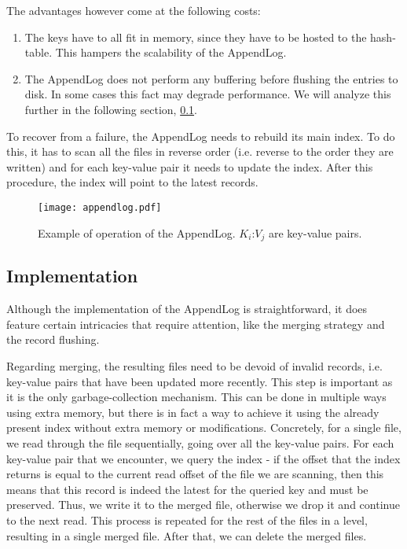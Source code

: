 The advantages however come at the following costs:
\begin{enumerate}
    \item The keys have to all fit in memory, since they have to be hosted to the hash-table. This hampers the scalability of the AppendLog.
    \item The AppendLog does not perform any buffering before flushing the entries to disk. In some cases this fact may degrade performance. We will analyze this further in the following section, \ref{appendlog-implementation}.
\end{enumerate}

To recover from a failure, the AppendLog needs to rebuild its main index. To do this, it has to scan all the files in reverse order (i.e. reverse to the order they are written) and for each key-value pair it needs to update the index. After this procedure, the index will point to the latest records.

\vspace{20px}
\begin{figure}[h]
    \centering
    \texttt{[image: appendlog.pdf]}
    \caption{Example of operation of the AppendLog. $K_i$:$V_j$ are key-value pairs.}
    \label{fig:appendlog}
\end{figure}
\vspace{20px}

\subsection{Implementation}
\label{appendlog-implementation}

Although the implementation of the AppendLog is straightforward, it does feature certain intricacies that require attention, like the merging strategy and the record flushing.

Regarding merging, the resulting files need to be devoid of invalid records, i.e. key-value pairs that have been updated more recently. This step is important as it is the only garbage-collection mechanism. This can be done in multiple ways using extra memory, but there is in fact a way to achieve it using the already present index without extra memory or modifications. Concretely, for a single file, we read through the file sequentially, going over all the key-value pairs. For each key-value pair that we encounter, we query the index - if the offset that the index returns is equal to the current read offset of the file we are scanning, then this means that this record is indeed the latest for the queried key and must be preserved. Thus, we write it to the merged file, otherwise we drop it and continue to the next read. This process is repeated for the rest of the files in a level, resulting in a single merged file. After that, we can delete the merged files.

